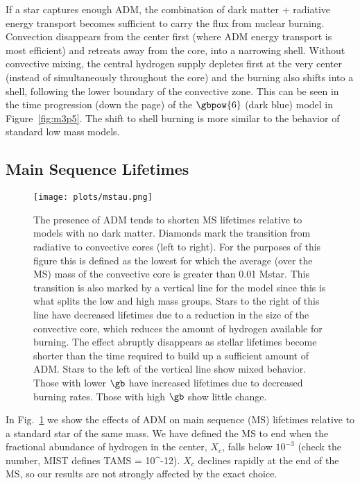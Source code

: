 If a star captures enough ADM, the combination of dark matter + radiative energy transport becomes sufficient to carry the flux from nuclear burning. Convection disappears from the center first (where ADM energy transport is most efficient) and retreats away from the core, into a narrowing shell. Without convective mixing, the central hydrogen supply depletes first at the very center (instead of simultaneously throughout the core) and the burning also shifts into a shell, following the lower boundary of the convective zone. This can be seen in the time progression (down the page) of the $\gbpow{6}$ (dark blue) model in Figure~\ref{fig:m3p5}. The shift to shell burning is more similar to the behavior of standard low mass models.


\subsection{Main Sequence Lifetimes}
\label{sub:mstau}

\begin{figure*}
  \centering
  \texttt{[image: plots/mstau.png]}
  \caption{The presence of ADM tends to shorten MS lifetimes relative to models with no dark matter.
  Diamonds mark the transition from radiative to convective cores (left to right). For the purposes of this figure this is defined as the lowest \Mstar for which the average (over the MS) mass of the convective core is greater than 0.01 Mstar. This transition is also marked by a vertical line for the \nodm model since this is what splits the low and high mass groups. Stars to the right of this line have decreased lifetimes due to a reduction in the size of the convective core, which reduces the amount of hydrogen available for burning. The effect abruptly disappears as stellar lifetimes become shorter than the time required to build up a sufficient amount of ADM. Stars to the left of the vertical line show mixed behavior. Those with lower $\gb$ have increased lifetimes due to decreased burning rates. Those with high $\gb$ show little change.
  }
  \label{fig:mstau}
\end{figure*}

In Fig.~\ref{fig:mstau} we show the effects of ADM on main sequence (MS) lifetimes relative to a standard \nodm star of the same mass. We have defined the MS to end when the fractional abundance of hydrogen in the center, $X_c$, falls below $10^{-3}$ (check the number, MIST defines TAMS = 10^-12). $X_c$ declines rapidly at the end of the MS, so our results are not strongly affected by the exact choice.

